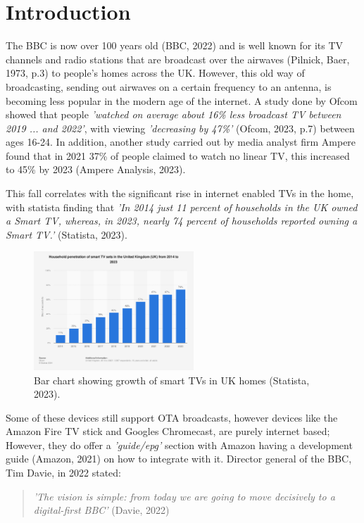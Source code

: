 \section{Introduction}

  The BBC is now over 100 years old (BBC, 2022) and is well known for its TV channels and radio stations that are broadcast over the airwaves (Pilnick, Baer, 1973, p.3) 
  to people's homes across the UK. However, this old way of broadcasting, sending out airwaves on a certain frequency to an antenna, is becoming 
  less popular in the modern age of the internet. A study done by Ofcom showed that people
  \textit{'watched on average about 16\% less broadcast TV between 2019 ... and 2022'}, with viewing \textit{'decreasing by 47\%'} (Ofcom, 2023, p.7) between ages
  16-24. In addition, another study carried out by media analyst firm Ampere found that in 2021 37\% of people claimed to watch no linear TV,
  this increased to 45\% by 2023 (Ampere Analysis, 2023).
  
  This fall correlates with the significant rise in internet enabled TVs in the home, with statista finding that 
  \textit{'In 2014 just 11 percent of households in the UK owned a Smart TV, whereas, in 2023, nearly 74 percent of households reported owning a Smart TV.'} (Statista, 2023).

  \begin{figure}[H]
    \centering
    \includegraphics[width=6cm]{assets/smartTvGrowth.png}
    \caption{Bar chart showing growth of smart TVs in UK homes (Statista, 2023).}
    \label{fig:smartTvGrowth}
  \end{figure}

  Some of these devices still support OTA broadcasts, however devices like the Amazon Fire TV stick and Googles Chromecast, are purely internet
  based; However, they do offer a \textit{'guide/epg'} section with Amazon having a development guide (Amazon, 2021) on how to integrate with it.
  Director general of the BBC, Tim Davie, in 2022 stated:
    \begin{quote}
      \textit{'The vision is simple: from today we are going to move decisively to  a digital-first BBC'} (Davie, 2022)
    \end{quote}

